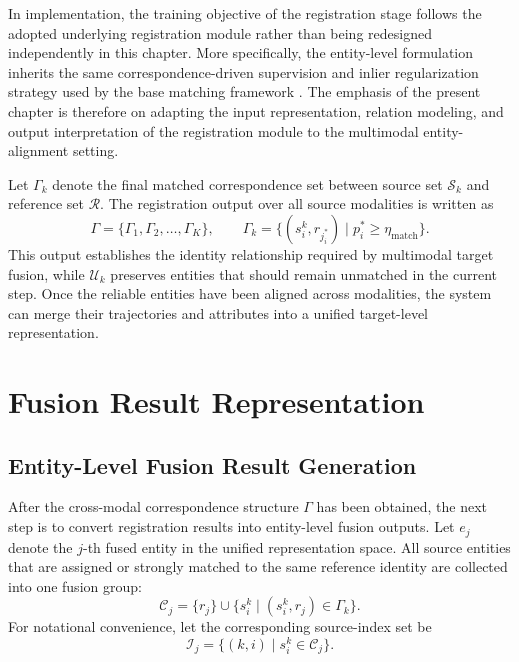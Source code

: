 In implementation, the training objective of the registration stage follows the adopted underlying registration module rather than being redesigned independently in this chapter. More specifically, the entity-level formulation inherits the same correspondence-driven supervision and inlier regularization strategy used by the base matching framework \cite{wang2019dcp,yew2020rpmnet}. The emphasis of the present chapter is therefore on adapting the input representation, relation modeling, and output interpretation of the registration module to the multimodal entity-alignment setting.

Let \(\Gamma_k\) denote the final matched correspondence set between source set \(\mathcal{S}_k\) and reference set \(\mathcal{R}\). The registration output over all source modalities is written as
\begin{equation}
  \Gamma = \{\Gamma_1,\Gamma_2,\ldots,\Gamma_K\}, \qquad
  \Gamma_k = \{(s_i^k,r_{j_i^{\ast}})\mid p_i^{\ast}\ge \eta_{\mathrm{match}}\}.
\end{equation}
This output establishes the identity relationship required by multimodal target fusion, while \(\mathcal{U}_k\) preserves entities that should remain unmatched in the current step. Once the reliable entities have been aligned across modalities, the system can merge their trajectories and attributes into a unified target-level representation.

\section{Fusion Result Representation}

\subsection{Entity-Level Fusion Result Generation}
After the cross-modal correspondence structure \(\Gamma\) has been obtained, the next step is to convert registration results into entity-level fusion outputs. Let \(e_j\) denote the \(j\)-th fused entity in the unified representation space. All source entities that are assigned or strongly matched to the same reference identity are collected into one fusion group:
\begin{equation}
  \mathcal{C}_j = \{r_j\} \cup \{s^k_i \mid (s^k_i,r_j) \in \Gamma_k\}.
\end{equation}
For notational convenience, let the corresponding source-index set be
\begin{equation}
  \mathcal{I}_j = \{(k,i)\mid s_i^k \in \mathcal{C}_j\}.
\end{equation}

